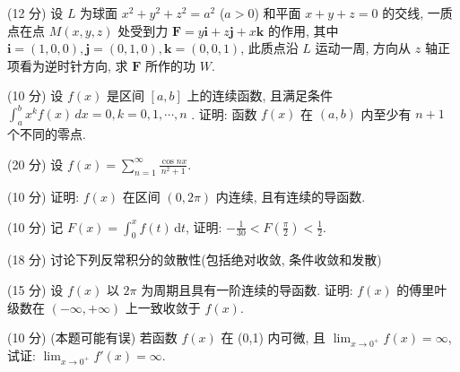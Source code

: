 \par{}
(12 分) 设 $L$ 为球面 $x^{2} + y^{2} + z^{2} = a^{2}$ ($a > 0$) 和平面 $x + y + z = 0$ 的交线, 一质点在点 $M(x, y, z)$ 处受到力 $\pmb{F} = y\pmb{i} + z\pmb{j} + x\pmb{k}$ 的作用, 其中 $\pmb{i} = (1, 0, 0), \pmb{j} = (0, 1, 0), \pmb{k} = (0, 0, 1)$, 此质点沿 $L$ 运动一周, 方向从 $z$ 轴正项看为逆时针方向, 求 $\pmb{F}$ 所作的功 $W$.\par
\par{}
(10 分) 设  $f(x)$  是区间  $[a, b]$  上的连续函数, 且满足条件  $\int_{a}^{b} x^{k} f(x) \, dx = 0, k = 0, 1, \cdots, n$ . 证明: 函数  $f(x)$  在  $(a, b)$  内至少有  $n + 1$  个不同的零点.\par
\par{}
(20 分) 设 $f(x) = \sum_{n=1}^{\infty} \frac{\cos nx}{n^2 + 1}$.\par
(10 分) 证明: $f(x)$ 在区间 $(0,2\pi)$ 内连续, 且有连续的导函数.\par
(10 分) 记 $F(x) = \int_{0}^{x} f(t) \, \mathrm{d}t$, 证明: $-\frac{1}{30} < F\left(\frac{\pi}{2}\right) < \frac{1}{2}$.\par
\par{}
\par{}
(18 分) 讨论下列反常积分的敛散性(包括绝对收敛, 条件收敛和发散)\par
\nopagebreak[4]
\par{}
(15 分) 设 $f(x)$ 以 $2\pi$ 为周期且具有一阶连续的导函数. 证明: $f(x)$ 的傅里叶级数在 $(-\infty, +\infty)$ 上一致收敛于 $f(x)$.\par
\par{}
(10 分) (本题可能有误) 若函数 $f(x)$ 在 (0,1) 内可微, 且 $\lim_{x\to 0^{+}}f(x) = \infty$, 试证: $\lim_{x\to 0^{+}}f'(x) = \infty$.\par

